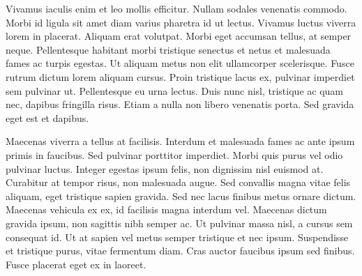 Vivamus iaculis enim et leo mollis efficitur. Nullam sodales venenatis commodo. Morbi id ligula sit amet diam varius pharetra id ut lectus. Vivamus luctus viverra lorem in placerat. Aliquam erat volutpat. Morbi eget accumsan tellus, at semper neque. Pellentesque habitant morbi tristique senectus et netus et malesuada fames ac turpis egestas. Ut aliquam metus non elit ullamcorper scelerisque. Fusce rutrum dictum lorem aliquam cursus. Proin tristique lacus ex, pulvinar imperdiet sem pulvinar ut. Pellentesque eu urna lectus. Duis nunc nisl, tristique ac quam nec, dapibus fringilla risus. Etiam a nulla non libero venenatis porta. Sed gravida eget est et dapibus.

Maecenas viverra a tellus at facilisis. Interdum et malesuada fames ac ante ipsum primis in faucibus. Sed pulvinar porttitor imperdiet. Morbi quis purus vel odio pulvinar luctus. Integer egestas ipsum felis, non dignissim nisl euismod at. Curabitur at tempor risus, non malesuada augue. Sed convallis magna vitae felis aliquam, eget tristique sapien gravida. Sed nec lacus finibus metus ornare dictum. Maecenas vehicula ex ex, id facilisis magna interdum vel. Maecenas dictum gravida ipsum, non sagittis nibh semper ac. Ut pulvinar massa nisl, a cursus sem consequat id. Ut at sapien vel metus semper tristique et nec ipsum. Suspendisse et tristique purus, vitae fermentum diam. Cras auctor faucibus ipsum sed finibus. Fusce placerat eget ex in laoreet.